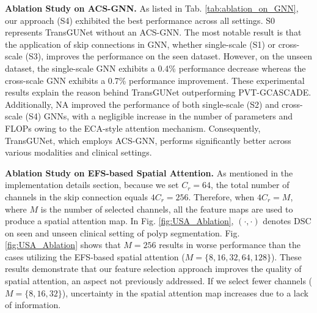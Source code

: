 \noindent \textbf{Ablation Study on ACS-GNN.} As listed in Tab. \ref{tab:ablation_on_GNN}, our approach (S4) exhibited the best performance across all settings. S0 represents TransGUNet without an ACS-GNN. The most notable result is that the application of skip connections in GNN, whether single-scale (S1) or cross-scale (S3), improves the performance on the seen dataset. However, on the unseen dataset, the single-scale GNN exhibits a 0.4\% performance decrease whereas the cross-scale GNN exhibits a 0.7\% performance improvement. These experimental results explain the reason behind TransGUNet outperforming PVT-GCASCADE. Additionally, NA improved the performance of both single-scale (S2) and cross-scale (S4) GNNs, with a negligible increase in the number of parameters and FLOPs owing to the ECA-style attention mechanism. Consequently, TransGUNet, which employs ACS-GNN, performs significantly better across various modalities and clinical settings.

\noindent \textbf{Ablation Study on EFS-based Spatial Attention.} As mentioned in the implementation details section, because we set $C_{r} = 64$, the total number of channels in the skip connection equals $4C_{r} = 256$. Therefore, when $4C_{r} = M$, where $M$ is the number of selected channels, all the feature maps are used to produce a spatial attention map. In Fig. \ref{fig:USA_Ablation}, $(\cdot, \cdot)$ denotes DSC on seen and unseen clinical setting of polyp segmentation. Fig. \ref{fig:USA_Ablation} shows that $M = 256$ results in worse performance than the cases utilizing the EFS-based spatial attention ($M = \{ 8, 16, 32, 64, 128\}$). These results demonstrate that our feature selection approach improves the quality of spatial attention, an aspect not previously addressed. If we select fewer channels ($M = \{ 8, 16, 32 \}$), uncertainty in the spatial attention map increases due to a lack of information.

